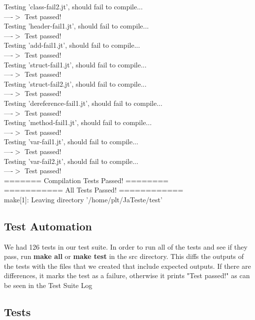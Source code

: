 \documentclass{article}
\begin{document}
Testing 'class-fail2.jt', should fail to compile...\\
  ----$>$  Test passed!\\
Testing 'header-fail1.jt', should fail to compile...\\
  ----$>$  Test passed!\\
Testing 'add-fail1.jt', should fail to compile...\\
  ----$>$  Test passed!\\
Testing 'struct-fail1.jt', should fail to compile...\\
  ----$>$  Test passed!\\
Testing 'struct-fail2.jt', should fail to compile...\\
  ----$>$  Test passed!\\
Testing 'dereference-fail1.jt', should fail to compile...\\
  ----$>$  Test passed!\\
Testing 'method-fail1.jt', should fail to compile...\\
  ----$>$  Test passed!\\
Testing 'var-fail1.jt', should fail to compile...\\
  ----$>$  Test passed!\\
Testing 'var-fail2.jt', should fail to compile...\\
  ----$>$  Test passed!\\
======= Compilation Tests Passed! ========\\
=========== All Tests Passed! ============\\
make[1]: Leaving directory '/home/plt/JaTeste/test'\\


\newpage


\subsection{Test Automation}
We had 126 tests in our test suite. In order to run all of the tests and see if they pass, run \textbf{make all} or \textbf{make test} in the src directory. This diffs the outputs of the tests with the files that we created that include expected outputs. If there are differences, it marks the test as a failure, otherwise it prints "Test passed!" as can be seen in the Test Suite Log

\newpage

\subsection{Tests}
\end{document}
